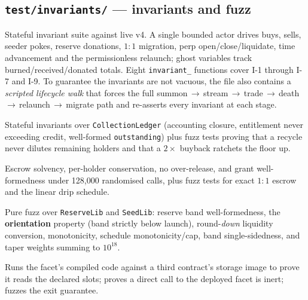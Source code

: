 \documentclass[10pt,a4paper]{article}
\newcommand{\code}[1]{\texttt{\small #1}}
\begin{document}
\subsection{\texttt{test/invariants/} --- invariants and fuzz}

\begin{description}[leftmargin=1.4em,style=nextline]

\item[\code{CauldronSystemInvariants.t.sol}] Stateful invariant suite against
live v4. A single bounded actor drives buys, sells, seeder pokes, reserve
donations, $1{:}1$ migration, perp open/close/liquidate, time advancement and
the permissionless relaunch; ghost variables track burned/received/donated
totals. Eight \code{invariant\_} functions cover I-1 through I-7 and I-9. To
guarantee the invariants are not vacuous, the file also contains a
\emph{scripted lifecycle walk} that forces the full
summon\,$\to$\,stream\,$\to$\,trade\,$\to$\,death\,$\to$\,relaunch\,$\to$\,migrate
path and re-asserts every invariant at each stage.

\item[\code{LedgerInvariants.t.sol}] Stateful invariants over
\code{CollectionLedger} (accounting closure, entitlement never exceeding
credit, well-formed \code{outstanding}) plus fuzz tests proving that a recycle
never dilutes remaining holders and that a $2\times$ buyback ratchets the floor
up.

\item[\code{VestingInvariants.t.sol}] Escrow solvency, per-holder conservation,
no over-release, and grant well-formedness under 128{,}000 randomised calls,
plus fuzz tests for exact $1{:}1$ escrow and the linear drip schedule.

\item[\code{ReserveMathFuzz.t.sol}] Pure fuzz over \code{ReserveLib} and
\code{SeedLib}: reserve band well-formedness, the \textbf{orientation} property
(band strictly below launch), round-\emph{down} liquidity conversion,
monotonicity, schedule monotonicity/cap, band single-sidedness, and taper
weights summing to $10^{18}$.

\item[\code{FacetLayoutInvariant.t.sol}] Runs the facet's compiled code against
a third contract's storage image to prove it reads the declared slots; proves a
direct call to the deployed facet is inert; fuzzes the exit guarantee.

\end{description}
\end{document}
